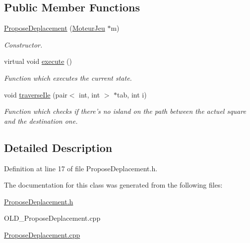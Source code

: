 \subsection*{Public Member Functions}
\begin{DoxyCompactItemize}
\item 
\hypertarget{class_propose_deplacement_a1a4042278b22fb2d79f9d4294614d9d9}{
\hyperlink{class_propose_deplacement_a1a4042278b22fb2d79f9d4294614d9d9}{ProposeDeplacement} (\hyperlink{class_moteur_jeu}{MoteurJeu} $\ast$m)}
\label{class_propose_deplacement_a1a4042278b22fb2d79f9d4294614d9d9}

\begin{DoxyCompactList}\small\item\em Constructor. \item\end{DoxyCompactList}\item 
\hypertarget{class_propose_deplacement_a486d26c93fd8bdb108ac5b0bcbb99cfd}{
virtual void \hyperlink{class_propose_deplacement_a486d26c93fd8bdb108ac5b0bcbb99cfd}{execute} ()}
\label{class_propose_deplacement_a486d26c93fd8bdb108ac5b0bcbb99cfd}

\begin{DoxyCompactList}\small\item\em Function which executes the current state. \item\end{DoxyCompactList}\item 
\hypertarget{class_propose_deplacement_a7f175e6c27e5b949159b6b6bb6c26242}{
void \hyperlink{class_propose_deplacement_a7f175e6c27e5b949159b6b6bb6c26242}{traverseIle} (pair$<$ int, int $>$ $\ast$tab, int i)}
\label{class_propose_deplacement_a7f175e6c27e5b949159b6b6bb6c26242}

\begin{DoxyCompactList}\small\item\em Function which checks if there's no island on the path between the actuel square and the destination one. \item\end{DoxyCompactList}\end{DoxyCompactItemize}


\subsection{Detailed Description}


Definition at line 17 of file ProposeDeplacement.h.



The documentation for this class was generated from the following files:\begin{DoxyCompactItemize}
\item 
\hyperlink{_propose_deplacement_8h}{ProposeDeplacement.h}\item 
OLD\_\-ProposeDeplacement.cpp\item 
\hyperlink{_propose_deplacement_8cpp}{ProposeDeplacement.cpp}\end{DoxyCompactItemize}
